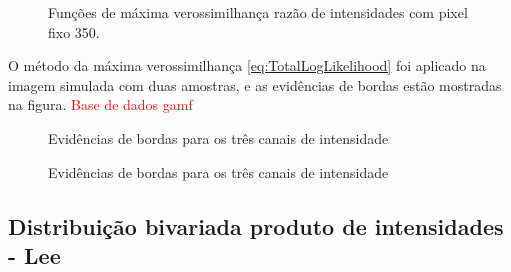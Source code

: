   \begin{figure*}[hbt]
	\centering
     \caption{Funções de máxima verossimilhança razão de intensidades com pixel fixo 350.}
     \label{fig:razao_l_250_r_80} 
   \end{figure*}   
   

O método da máxima verossimilhança \eqref{eq:TotalLogLikelihood} foi aplicado na imagem simulada com duas amostras, e as evidências de bordas estão mostradas na figura. \textcolor{red}{Base de dados gamf}
 \begin{figure*}[hbt]
	\centering
    \caption{Evidências de bordas para os três canais de intensidade}
     \label{evidencias_hh_hv_vv_gamf} 
   \end{figure*}
   
   \begin{figure*}[hbt]
	\centering
    \caption{Evidências de bordas para os três canais de intensidade}
     \label{evidencias_hh_hv_vv_gamf} 
   \end{figure*}   
   
   
\subsection{Distribuição bivariada produto de intensidades - Lee } 

